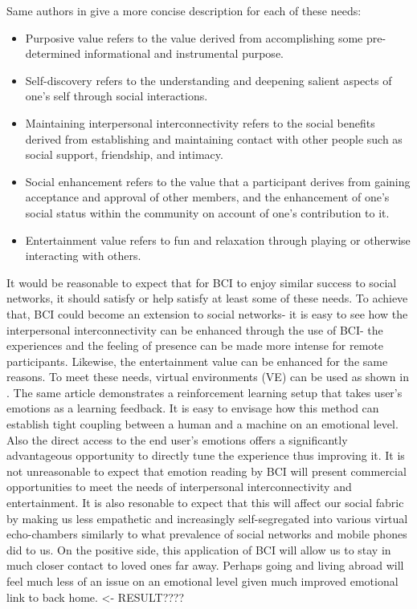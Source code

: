 \documentclass[fleqn,11pt]{olplainarticle}
\begin{document}
Same authors in \cite{cheung2011online} give a more concise description for each of these needs: 
\begin{displayquote}
    \begin{itemize}
        \item Purposive value refers to the value derived from accomplishing some pre-determined informational and instrumental purpose.
        \item Self-discovery refers to the understanding and deepening salient aspects of one’s self through social interactions.
        \item Maintaining interpersonal interconnectivity refers to the social benefits derived from establishing and maintaining contact with other people such as social support, friendship, and intimacy.
        \item Social enhancement refers to the value that a participant derives from gaining acceptance and approval of other members, and the enhancement of one’s social status within the community on account of one’s contribution to it.
        \item Entertainment value refers to fun and relaxation through playing or otherwise interacting with others.
    \end{itemize}
\end{displayquote}

It would be reasonable to expect that for BCI to enjoy similar success to social networks, it should satisfy or help satisfy at least some of these needs. To achieve that, BCI could become an extension to social networks- it is easy to see how the interpersonal interconnectivity can be enhanced through the use of BCI- the experiences and the feeling of presence can be made more intense for remote participants. Likewise, the entertainment value can be enhanced for the same reasons. To meet these needs, virtual environments (VE) can be used as shown in \cite{shih2017deep}. The same article demonstrates a reinforcement learning setup that takes user's emotions as a learning feedback. It is easy to envisage how this method can establish tight coupling between a human and a machine on an emotional level. Also the direct access to the end user's emotions offers a significantly advantageous opportunity to directly tune the experience thus improving it. It is not unreasonable to expect that emotion reading by BCI will present commercial opportunities to meet the needs of interpersonal interconnectivity and entertainment. It is also resonable to expect that this will affect our social fabric by making us less empathetic and increasingly self-segregated into various virtual echo-chambers similarly to what prevalence of social networks and mobile phones did to us. On the positive side, this application of BCI will allow us to stay in much closer contact to loved ones far away. Perhaps going and living abroad will feel much less of an issue on an emotional level given much improved emotional link to back home. <- RESULT????
\end{document}
